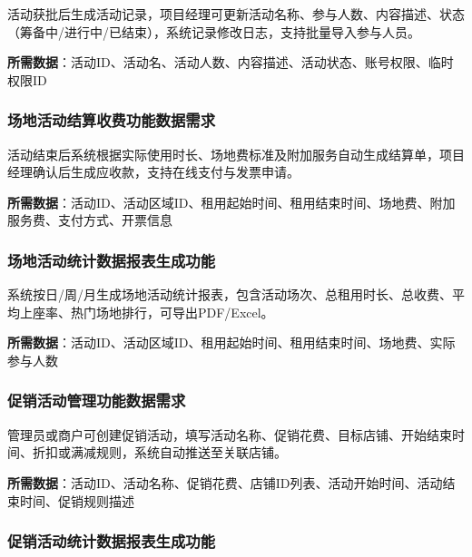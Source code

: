 \documentclass[]{article}
\begin{document}
活动获批后生成活动记录，项目经理可更新活动名称、参与人数、内容描述、状态（筹备中/进行中/已结束），系统记录修改日志，支持批量导入参与人员。

\textbf{所需数据}：活动ID、活动名、活动人数、内容描述、活动状态、账号权限、临时权限ID

\hypertarget{ux573aux5730ux6d3bux52a8ux7ed3ux7b97ux6536ux8d39ux529fux80fdux6570ux636eux9700ux6c42}{%
\subsubsection{场地活动结算收费功能数据需求}\label{ux573aux5730ux6d3bux52a8ux7ed3ux7b97ux6536ux8d39ux529fux80fdux6570ux636eux9700ux6c42}}

活动结束后系统根据实际使用时长、场地费标准及附加服务自动生成结算单，项目经理确认后生成应收款，支持在线支付与发票申请。

\textbf{所需数据}：活动ID、活动区域ID、租用起始时间、租用结束时间、场地费、附加服务费、支付方式、开票信息

\hypertarget{ux573aux5730ux6d3bux52a8ux7edfux8ba1ux6570ux636eux62a5ux8868ux751fux6210ux529fux80fd}{%
\subsubsection{场地活动统计数据报表生成功能}\label{ux573aux5730ux6d3bux52a8ux7edfux8ba1ux6570ux636eux62a5ux8868ux751fux6210ux529fux80fd}}

系统按日/周/月生成场地活动统计报表，包含活动场次、总租用时长、总收费、平均上座率、热门场地排行，可导出PDF/Excel。

\textbf{所需数据}：活动ID、活动区域ID、租用起始时间、租用结束时间、场地费、实际参与人数

\hypertarget{ux4fc3ux9500ux6d3bux52a8ux7ba1ux7406ux529fux80fdux6570ux636eux9700ux6c42}{%
\subsubsection{促销活动管理功能数据需求}\label{ux4fc3ux9500ux6d3bux52a8ux7ba1ux7406ux529fux80fdux6570ux636eux9700ux6c42}}

管理员或商户可创建促销活动，填写活动名称、促销花费、目标店铺、开始结束时间、折扣或满减规则，系统自动推送至关联店铺。

\textbf{所需数据}：活动ID、活动名称、促销花费、店铺ID列表、活动开始时间、活动结束时间、促销规则描述

\hypertarget{ux4fc3ux9500ux6d3bux52a8ux7edfux8ba1ux6570ux636eux62a5ux8868ux751fux6210ux529fux80fd}{%
\subsubsection{促销活动统计数据报表生成功能}\label{ux4fc3ux9500ux6d3bux52a8ux7edfux8ba1ux6570ux636eux62a5ux8868ux751fux6210ux529fux80fd}}
\end{document}
